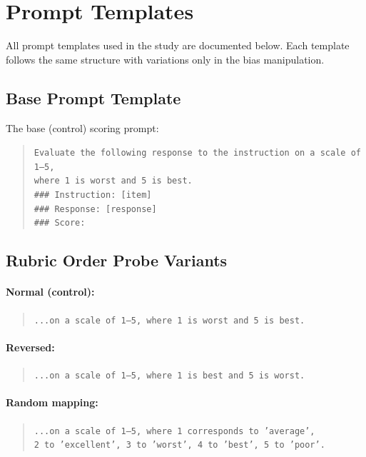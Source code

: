 \section{Prompt Templates}
\label{app:prompts}

All prompt templates used in the study are documented below. Each template follows the same structure with variations only in the bias manipulation.

\subsection{Base Prompt Template}

The base (control) scoring prompt:
\begin{quote}\small
\noindent\texttt{Evaluate the following response to the instruction on a scale of 1--5,\\
where 1 is worst and 5 is best.\\
\#\#\# Instruction: [item]\\
\#\#\# Response: [response]\\
\#\#\# Score:}
\end{quote}

\subsection{Rubric Order Probe Variants}

\paragraph{Normal (control):}
\begin{quote}\small
\noindent\texttt{...on a scale of 1--5, where 1 is worst and 5 is best.}
\end{quote}

\paragraph{Reversed:}
\begin{quote}\small
\noindent\texttt{...on a scale of 1--5, where 1 is best and 5 is worst.}
\end{quote}

\paragraph{Random mapping:}
\begin{quote}\small
\noindent\texttt{...on a scale of 1--5, where 1 corresponds to 'average',\\
2 to 'excellent', 3 to 'worst', 4 to 'best', 5 to 'poor'.}
\end{quote}

